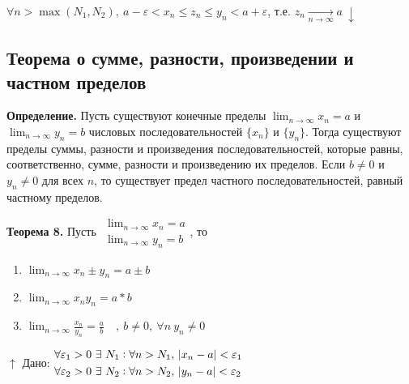 \documentclass{article}
\begin{document}
    \(\forall n > \max{(N_1, N_2)},\ a - \varepsilon < x_n \leq z_n \leq y_n < a + \varepsilon\), т.е. \(z_n \xrightarrow[n \rightarrow \infty]{} a\ \downarrow\)
    
    \subsection{Теорема о сумме, разности, произведении и частном пределов}
    
    \textbf{Определение.} Пусть существуют конечные пределы $\lim_{n \rightarrow \infty}{x_n} = a$ и $\lim_{n \rightarrow \infty}{y_n} = b$ числовых последовательностей $\{x_n\}$ и $\{y_n\}$. Тогда существуют пределы суммы, разности и произведения последовательностей, которые равны, соответственно, сумме, разности и произведению их пределов. Если  $b \neq 0$  и  $y_n \neq 0$  для всех $n$, то существует предел частного последовательностей, равный частному пределов.

    \textbf{Теорема 8.} Пусть \(\begin{aligned}
    	\lim_{n \rightarrow \infty}{x_n} = a\\
        \lim_{n \rightarrow \infty}{y_n} = b
        \end{aligned}\), то
        \begin{enumerate}
        	\item \(\lim_{n \rightarrow \infty}{x_n \pm y_n} = a \pm b\)
            \item \(\lim_{n \rightarrow \infty}{x_n y_n} = a*b\)
            \item \(\lim_{n \rightarrow \infty}{\frac{x_n}{y_n}} = \frac{a}{b} \quad,\ b \neq 0,\ \forall n\ y_n \neq 0\)
        \end{enumerate}
    
    \(\uparrow\) Дано: \(\begin{aligned}
      	&\forall \varepsilon_1 > 0\ \exists\ N_1 : \forall n > N_1,\ \abs{x_n - a} < \varepsilon_1\\
        &\forall \varepsilon_2 > 0\ \exists\ N_2 : \forall n > N_2,\ \abs{y_n - a} < \varepsilon_2
        \end{aligned}\)
    
\end{document}
